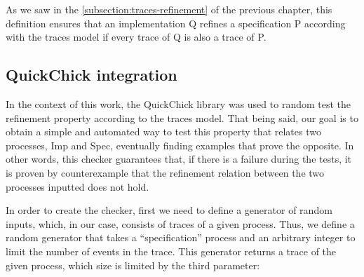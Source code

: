 As we saw in the \autoref{subsection:traces-refinement} of the previous chapter, this definition ensures that an implementation Q refines a specification P according with the traces model if every trace of Q is also a trace of P.

\subsection{QuickChick integration}

In the context of this work, the QuickChick library was used to random test the refinement property according to the traces model. That being said, our goal is to obtain a simple and automated way to test this property that relates two processes, Imp and Spec, eventually finding examples that prove the opposite. In other words, this checker guarantees that, if there is a failure during the tests, it is proven by counterexample that the refinement relation between the two processes inputted does not hold.

In order to create the checker, first we need to define a generator of random inputs, which, in our case, consists of traces of a given process. Thus, we define a random generator that takes a ``specification'' process and an arbitrary integer to limit the number of events in the trace. This generator returns a trace of the given process, which size is limited by the third parameter:


